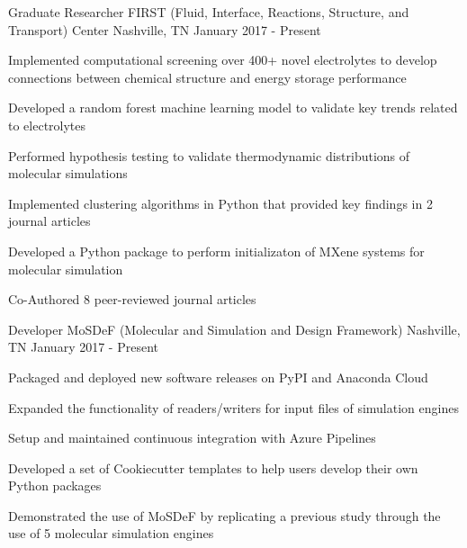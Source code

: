 
\begin{cventries}
  \cventry
    {Graduate Researcher} %
    {FIRST (Fluid, Interface, Reactions, Structure, and Transport) Center} %
    {Nashville, TN} %
    {January 2017 - Present} %
    {
      \begin{cvitems} %
        \item{Implemented computational screening over 400+ novel electrolytes to
        develop \newline
        connections between chemical structure and energy storage performance}
        \item {Developed a random forest machine learning model to validate key trends related to
            electrolytes}
        \item{Performed hypothesis testing to validate thermodynamic
            distributions of molecular simulations}
        \item {Implemented clustering algorithms in Python that
            provided key findings in 2 journal articles}
        \item {Developed a Python package to perform initializaton of 
            MXene systems for molecular simulation}
        \item {Co-Authored 8 peer-reviewed journal articles}
      \end{cvitems}
    }

  \cventry
    {Developer} %
    {MoSDeF (Molecular and Simulation and Design Framework)} %
    {Nashville, TN} %
    {January 2017 - Present} %
    {
      \begin{cvitems} %
      \item {Packaged and deployed new software releases on PyPI and Anaconda
          Cloud}
        \item {Expanded the functionality of readers/writers for input files of
            simulation engines}
        \item{Setup and maintained continuous integration with Azure Pipelines}
        \item{Developed a set of Cookiecutter templates to help users develop
            their own Python packages}
        \item{Demonstrated the use of MoSDeF by replicating a previous study
            through the use of 5 molecular simulation engines}
      \end{cvitems}
    }
\end{cventries}
